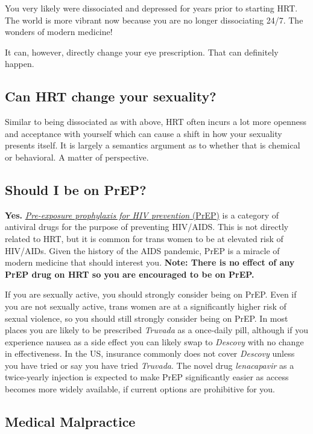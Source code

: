 \documentclass{article}
\begin{document}
You very likely were dissociated and depressed for years prior to starting HRT. The world is more vibrant now because you are no longer dissociating 24/7. The wonders of modern medicine!

It can, however, directly change your eye prescription. That can definitely happen.

\subsection{Can HRT change your sexuality?}

Similar to being dissociated as with above, HRT often incurs a lot more openness and acceptance with yourself which can cause a shift in how your sexuality presents itself. It is largely a semantics argument as to whether that is chemical or behavioral. A matter of perspective. 

\subsection{Should I be on PrEP?}\label{11-25}

\textbf{Yes.} \href{https://en.wikipedia.org/wiki/Pre-exposure_prophylaxis_for_HIV_prevention}{\textit{Pre-exposure prophylaxis for HIV prevention} (PrEP)} is a category of antiviral drugs for the purpose of preventing HIV/AIDS. This is not directly related to HRT, but it is common for trans women to be at elevated risk of HIV/AIDs. Given the history of the AIDS pandemic, PrEP is a miracle of modern medicine that should interest you. \textbf{Note: There is no effect of any PrEP drug on HRT so you are encouraged to be on PrEP.}

If you are sexually active, you should strongly consider being on PrEP. Even if you are not sexually active, trans women are at a significantly higher risk of sexual violence, so you should still strongly consider being on PrEP. In most places you are likely to be prescribed \textit{Truvada} as a once-daily pill, although if you experience nausea as a side effect you can likely swap to \textit{Descovy} with no change in effectiveness. In the US, insurance commonly does not cover \textit{Descovy} unless you have tried or say you have tried \textit{Truvada}. The novel drug \textit{lenacapavir} as a twice-yearly injection is expected to make PrEP significantly easier as access becomes more widely available, if current options are prohibitive for you.

\subsection*{Medical Malpractice}
\end{document}
